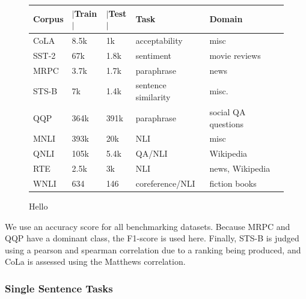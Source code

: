 \documentclass[a4paper,12pt,twoside,openright]{report}
\begin{document}
\begin{figure}[H]
\center
\begin{tabular}{
 l %
 l %
 l
 l
 l
 l
}
\toprule
\textbf{Corpus} & \textbf{ $|$Train$|$ } &\textbf{$|$Test$|$} & \textbf{Task} & \textbf{Domain}  \\
\midrule
CoLA  & 8.5k  &  1k   & acceptability &  misc \\

SST-2 & 67k &  1.8k  & sentiment &  movie reviews \\

MRPC & 3.7k &  1.7k & paraphrase & news \\
          
STS-B & 7k &  1.4k    & sentence similarity &  misc. \\
      
QQP & 364k &  391k & paraphrase  &  social QA questions\\	

MNLI & 393k &  20k  & NLI  &  misc \\

QNLI & 105k &  5.4k & QA/NLI &  Wikipedia \\

RTE & 2.5k &  3k      & NLI &  news, Wikipedia \\

WNLI & 634 &  146   & coreference/NLI & fiction books \\

      
\bottomrule
\end{tabular}
\caption{Hello}
\end{figure}

We use an accuracy score for all benchmarking datasets. Because MRPC and QQP have a dominant class, the F1-score is used here. Finally, STS-B is judged using a pearson and spearman correlation due to a ranking being produced, and CoLa is assessed using the Matthews correlation.

\subsubsection{Single Sentence Tasks}
\end{document}
